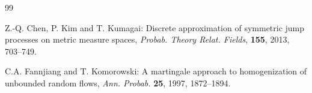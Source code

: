 \documentclass[11pt,draft, reqno]{amsart}
\theoremstyle{definition}
\numberwithin{equation}{section}
\begin{document}
\begin{thebibliography}{99}






 Z.-Q. Chen, P. Kim and T. Kumagai: Discrete approximation of symmetric jump processes on metric measure spaces, \emph{Probab. Theory Relat. Fields},
{\bf 155}, 2013, 703--749.












 C.A. Fannjiang and T. Komorowski:
A martingale approach to homogenization of unbounded random flows, \emph{Ann. Probab.} {\bf 25}, 1997, 1872--1894.


\end{thebibliography}
\end{document}
